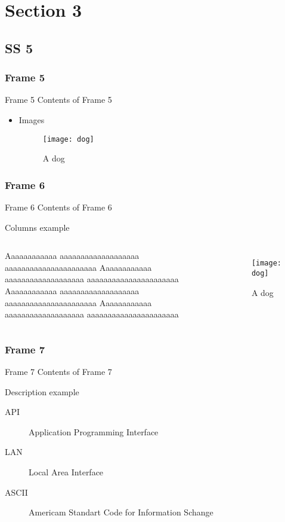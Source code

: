 \documentclass[12pt]{beamer}
\begin{document}
\section{Section 3}
\subsection{SS 5}
\begin{frame}[shrink]
\frametitle{Frame 5}
\begin{block}{Frame 5}
\pause
Contents of Frame 5

\begin{itemize}
\item{Images}

\begin{figure}
\centering
\texttt{[image: dog]}
\caption{A dog}
\end{figure}

\end{itemize}
\end{block}
\end{frame}

\begin{frame}[shrink]
\frametitle{Frame 6}
\begin{block}{Frame 6}
\pause
Contents of Frame 6

Columns example

\begin{columns}
Aaaaaaaaaaaa aaaaaaaaaaaaaaaaaaa aaaaaaaaaaaaaaaaaaaaaa
Aaaaaaaaaaaa aaaaaaaaaaaaaaaaaaa aaaaaaaaaaaaaaaaaaaaaa
Aaaaaaaaaaaa aaaaaaaaaaaaaaaaaaa aaaaaaaaaaaaaaaaaaaaaa
Aaaaaaaaaaaa aaaaaaaaaaaaaaaaaaa aaaaaaaaaaaaaaaaaaaaaa

\begin{figure}
\texttt{[image: dog]}
\caption{A dog}
\end{figure}

\end{columns}
\end{block}
\end{frame}

\begin{frame}[shrink]
\frametitle{Frame 7}
\begin{block}{Frame 7}
\pause
Contents of Frame 7

Description example

\begin{description}
\item[API] Application Programming Interface
\item[LAN] Local Area Interface
\item[ASCII] Americam Standart Code for Information Schange
\end{description}
\end{block}
\end{frame}
\end{document}
